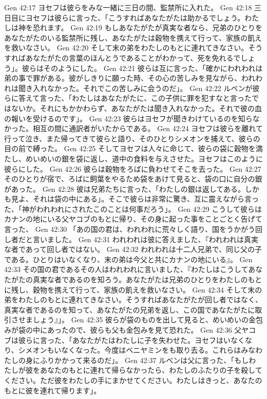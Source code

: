 Gen 42:17  ヨセフは彼らをみな一緒に三日の間、監禁所に入れた。
Gen 42:18  三日目にヨセフは彼らに言った、「こうすればあなたがたは助かるでしょう。わたしは神を恐れます。
Gen 42:19  もしあなたがたが真実な者なら、兄弟のひとりをあなたがたのいる監禁所に残し、あなたがたは穀物を携えて行って、家族の飢えを救いなさい。
Gen 42:20  そして末の弟をわたしのもとに連れてきなさい。そうすればあなたがたの言葉のほんとうであることがわかって、死を免れるでしょう」。彼らはそのようにした。
Gen 42:21  彼らは互に言った、「確かにわれわれは弟の事で罪がある。彼がしきりに願った時、その心の苦しみを見ながら、われわれは聞き入れなかった。それでこの苦しみに会うのだ」。
Gen 42:22  ルベンが彼らに答えて言った、「わたしはあなたがたに、この子供に罪を犯すなと言ったではないか。それにもかかわらず、あなたがたは聞き入れなかった。それで彼の血の報いを受けるのです」。
Gen 42:23  彼らはヨセフが聞きわけているのを知らなかった。相互の間に通訳者がいたからである。
Gen 42:24  ヨセフは彼らを離れて行って泣き、また帰ってきて彼らと語り、そのひとりシメオンを捕えて、彼らの目の前で縛った。
Gen 42:25  そしてヨセフは人々に命じて、彼らの袋に穀物を満たし、めいめいの銀を袋に返し、道中の食料を与えさせた。ヨセフはこのように彼らにした。
Gen 42:26  彼らは穀物をろばに負わせてそこを去った。
Gen 42:27  そのひとりが宿で、ろばに飼葉をやるため袋をあけて見ると、袋の口に自分の銀があった。
Gen 42:28  彼は兄弟たちに言った、「わたしの銀は返してある。しかも見よ、それは袋の中にある」。そこで彼らは非常に驚き、互に震えながら言った、「神がわれわれにされたこのことは何事だろう」。
Gen 42:29  こうして彼らはカナンの地にいる父ヤコブのもとに帰り、その身に起った事をことごとく告げて言った、
Gen 42:30  「あの国の君は、われわれに荒々しく語り、国をうかがう回し者だと言いました。
Gen 42:31  われわれは彼に答えました、『われわれは真実な者であって回し者ではない。
Gen 42:32  われわれは十二人兄弟で、同じ父の子である。ひとりはいなくなり、末の弟は今父と共にカナンの地にいる』。
Gen 42:33  その国の君であるその人はわれわれに言いました、『わたしはこうしてあなたがたの真実な者であるのを知ろう。あなたがたは兄弟のひとりをわたしのもとに残し、穀物を携えて行って、家族の飢えを救いなさい。
Gen 42:34  そして末の弟をわたしのもとに連れてきなさい。そうすればあなたがたが回し者ではなく、真実な者であるのを知って、あなたがたの兄弟を返し、この国であなたがたに取引させましょう』」。
Gen 42:35  彼らが袋のものを出して見ると、めいめいの金包みが袋の中にあったので、彼らも父も金包みを見て恐れた。
Gen 42:36  父ヤコブは彼らに言った、「あなたがたはわたしに子を失わせた。ヨセフはいなくなり、シメオンもいなくなった。今度はベニヤミンをも取り去る。これらはみなわたしの身にふりかかって来るのだ」。
Gen 42:37  ルベンは父に言った、「もしわたしが彼をあなたのもとに連れて帰らなかったら、わたしのふたりの子を殺してください。ただ彼をわたしの手にまかせてください。わたしはきっと、あなたのもとに彼を連れて帰ります」。
